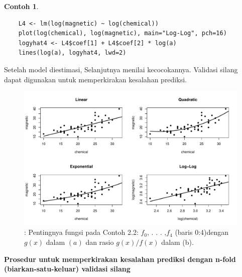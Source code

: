 \documentclass[a4paper,12pt]{article}
\theoremstyle{definition}
\newtheorem{example}{Contoh}[section]
\begin{document}
\begin{example}
\begin{lstlisting}
    L4 <- lm(log(magnetic) ~ log(chemical))
    plot(log(chemical), log(magnetic), main="Log-Log", pch=16)
    logyhat4 <- L4$coef[1] + L4$coef[2] * log(a)
    lines(log(a), logyhat4, lwd=2)
\end{lstlisting}  
Setelah model diestimasi, Selanjutnya menilai kecocokannya. Validasi silang dapat digunakan untuk memperkirakan kesalahan prediksi.
 \begin{figure}[h]
        \centering
        \includegraphics [width=\textwidth]{gb/K8G2}
        \caption{: Pentingnya fungsi pada Contoh 2.2: $f_{0}$, . . . ,$ f_{4}$ (baris 0:4)dengan $g(x)$ dalam $(a)$ dan rasio $g(x)/f(x)$ dalam (b).}
        \label{fig:my_label}
        \end{figure}
\end{example}
\textbf{Prosedur untuk memperkirakan kesalahan prediksi dengan n-fold (biarkan-satu-keluar) validasi silang}
\end{document}
